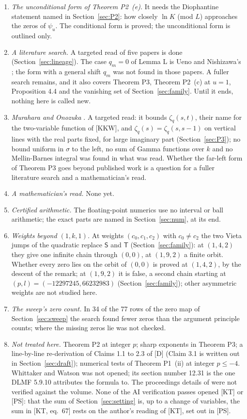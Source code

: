 \documentclass[11pt]{article}
\begin{document}
\begin{enumerate}
\item \emph{The unconditional form of Theorem P2~(e).} It needs the Diophantine statement named in Section~\ref{sec:P2}: how closely $\ln K$ (mod $L$) approaches the zeros of $\psi_u$. The conditional form is proved; the unconditional form is outlined only.
\item \emph{A literature search.} A targeted read of five papers is done (Section~\ref{sec:lineage}). The case $q_m=0$ of Lemma L is Ueno and Nishizawa's \cite{UN}; the form with a general shift $q_m$ was not found in those papers. A fuller search remains, and it also covers Theorem P3, Theorem P2~(c) at $u=1$, Proposition 4.4 and the vanishing set of Section~\ref{sec:family}. Until it ends, nothing here is called new.
\item \emph{Murahara and Onozuka} \cite{MO}. A targeted read: it bounds $\zeta_q(s,t)$, their name for the two-variable function of [KKW], and $\zeta_q(s)=\zeta_q(s,s-1)$ on vertical lines with the real parts fixed, for large imaginary part (Section~\ref{sec:P3}); no bound uniform in $\sigma$ to the left, no sum of Gamma functions over $k$ and no Mellin-Barnes integral was found in what was read. Whether the far-left form of Theorem P3 goes beyond published work is a question for a fuller literature search and a mathematician's read.
\item \emph{A mathematician's read.} None yet.
\item \emph{Certified arithmetic.} The floating-point numerics use no interval or ball arithmetic; the exact parts are named in Section~\ref{sec:num}, at its end.
\item \emph{Weights beyond $(1,k,1)$.} At weights $(c_0,c_1,c_2)$ with $c_0\ne c_2$ the two Vieta jumps of the quadratic replace $\mathsf{S}$ and $\mathsf{T}$ (Section~\ref{sec:family}): at $(1,4,2)$ they give one infinite chain through $(0,0)$, at $(1,9,2)$ a finite orbit. Whether every zero lies on the orbit of $(0,0)$ is proved at $(1,4,2)$, by the descent of the remark; at $(1,9,2)$ it is false, a second chain starting at $(p,l)=(-12297245,66232983)$ (Section~\ref{sec:family}); other asymmetric weights are not studied here.
\item \emph{The sweep's zero count.} In 34 of the 77 rows of the zero map of Section~\ref{sec:sweep} the search found fewer zeros than the argument principle counts; where the missing zeros lie was not checked.
\item \emph{Not treated here.} Theorem P2 at integer $p$; sharp exponents in Theorem P3; a line-by-line re-derivation of Claims 1.1 to 2.3 of [D] (Claim 3.1 is written out in Section~\ref{sec:draft}); numerical tests of Theorem P1~(ii) at integer $p\le-4$. Whittaker and Watson was not opened; its section number 12.31 is the one DLMF 5.9.10 attributes the formula to. The proceedings details of \cite{UN} were not verified against the volume. None of the AI verification passes opened [KT] or [PS]: that the sum of Section~\ref{sec:setting} is, up to a change of variables, the sum in [KT, eq.~67] rests on the author's reading of [KT], set out in [PS].

\end{enumerate}
\end{document}
